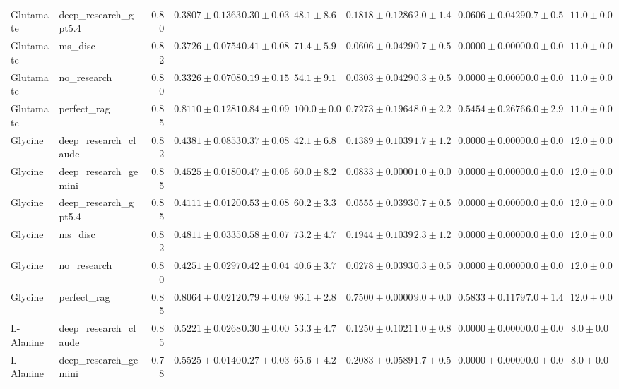 \begin{table}[htbp]
\begin{tabular}{llrrrrrrrrr}
Glutamate & deep_research_gpt5.4 & 0.80 & $0.3807 \pm 0.1363$ & $0.30 \pm 0.03$ & $48.1 \pm 8.6$ & $0.1818 \pm 0.1286$ & $2.0 \pm 1.4$ & $0.0606 \pm 0.0429$ & $0.7 \pm 0.5$ & $11.0 \pm 0.0$ \\
Glutamate & ms_disc & 0.82 & $0.3726 \pm 0.0754$ & $0.41 \pm 0.08$ & $71.4 \pm 5.9$ & $0.0606 \pm 0.0429$ & $0.7 \pm 0.5$ & $0.0000 \pm 0.0000$ & $0.0 \pm 0.0$ & $11.0 \pm 0.0$ \\
Glutamate & no_research & 0.80 & \cellcolor{red!25}$0.3326 \pm 0.0708$ & $0.19 \pm 0.15$ & $54.1 \pm 9.1$ & $0.0303 \pm 0.0429$ & $0.3 \pm 0.5$ & $0.0000 \pm 0.0000$ & $0.0 \pm 0.0$ & $11.0 \pm 0.0$ \\
Glutamate & perfect_rag & 0.85 & \cellcolor{green!25}$0.8110 \pm 0.1281$ & $0.84 \pm 0.09$ & $100.0 \pm 0.0$ & $0.7273 \pm 0.1964$ & $8.0 \pm 2.2$ & $0.5454 \pm 0.2676$ & $6.0 \pm 2.9$ & $11.0 \pm 0.0$ \\
\midrule
Glycine & deep_research_claude & 0.82 & $0.4381 \pm 0.0853$ & $0.37 \pm 0.08$ & $42.1 \pm 6.8$ & $0.1389 \pm 0.1039$ & $1.7 \pm 1.2$ & $0.0000 \pm 0.0000$ & $0.0 \pm 0.0$ & $12.0 \pm 0.0$ \\
Glycine & deep_research_gemini & 0.85 & $0.4525 \pm 0.0180$ & $0.47 \pm 0.06$ & $60.0 \pm 8.2$ & $0.0833 \pm 0.0000$ & $1.0 \pm 0.0$ & $0.0000 \pm 0.0000$ & $0.0 \pm 0.0$ & $12.0 \pm 0.0$ \\
Glycine & deep_research_gpt5.4 & 0.85 & \cellcolor{red!25}$0.4111 \pm 0.0120$ & $0.53 \pm 0.08$ & $60.2 \pm 3.3$ & $0.0555 \pm 0.0393$ & $0.7 \pm 0.5$ & $0.0000 \pm 0.0000$ & $0.0 \pm 0.0$ & $12.0 \pm 0.0$ \\
Glycine & ms_disc & 0.82 & $0.4811 \pm 0.0335$ & $0.58 \pm 0.07$ & $73.2 \pm 4.7$ & $0.1944 \pm 0.1039$ & $2.3 \pm 1.2$ & $0.0000 \pm 0.0000$ & $0.0 \pm 0.0$ & $12.0 \pm 0.0$ \\
Glycine & no_research & 0.80 & $0.4251 \pm 0.0297$ & $0.42 \pm 0.04$ & $40.6 \pm 3.7$ & $0.0278 \pm 0.0393$ & $0.3 \pm 0.5$ & $0.0000 \pm 0.0000$ & $0.0 \pm 0.0$ & $12.0 \pm 0.0$ \\
Glycine & perfect_rag & 0.85 & \cellcolor{green!25}$0.8064 \pm 0.0212$ & $0.79 \pm 0.09$ & $96.1 \pm 2.8$ & $0.7500 \pm 0.0000$ & $9.0 \pm 0.0$ & $0.5833 \pm 0.1179$ & $7.0 \pm 1.4$ & $12.0 \pm 0.0$ \\
\midrule
L-Alanine & deep_research_claude & 0.85 & $0.5221 \pm 0.0268$ & $0.30 \pm 0.00$ & $53.3 \pm 4.7$ & $0.1250 \pm 0.1021$ & $1.0 \pm 0.8$ & $0.0000 \pm 0.0000$ & $0.0 \pm 0.0$ & $8.0 \pm 0.0$ \\
L-Alanine & deep_research_gemini & 0.78 & $0.5525 \pm 0.0140$ & $0.27 \pm 0.03$ & $65.6 \pm 4.2$ & $0.2083 \pm 0.0589$ & $1.7 \pm 0.5$ & $0.0000 \pm 0.0000$ & $0.0 \pm 0.0$ & $8.0 \pm 0.0$ \\

\end{tabular}
\end{table}
